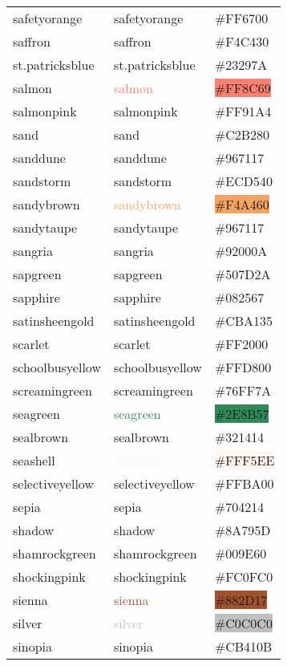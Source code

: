 \documentclass[
]{article}
\begin{document}
\begin{longtable}[]{@{}lll@{}}
safetyorange & \textcolor{safetyorange}{safetyorange} &
\colorbox{safetyorange}{\#FF6700}\tabularnewline
saffron & \textcolor{saffron}{saffron} &
\colorbox{saffron}{\#F4C430}\tabularnewline
st.patricksblue & \textcolor{st.patricksblue}{st.patricksblue} &
\colorbox{st.patricksblue}{\#23297A}\tabularnewline
salmon & \textcolor{salmon}{salmon} &
\colorbox{salmon}{\#FF8C69}\tabularnewline
salmonpink & \textcolor{salmonpink}{salmonpink} &
\colorbox{salmonpink}{\#FF91A4}\tabularnewline
sand & \textcolor{sand}{sand} &
\colorbox{darkchampagne}{\#C2B280}\tabularnewline
sanddune & \textcolor{sanddune}{sanddune} &
\colorbox{drab}{\#967117}\tabularnewline
sandstorm & \textcolor{sandstorm}{sandstorm} &
\colorbox{sandstorm}{\#ECD540}\tabularnewline
sandybrown & \textcolor{sandybrown}{sandybrown} &
\colorbox{sandybrown}{\#F4A460}\tabularnewline
sandytaupe & \textcolor{sandytaupe}{sandytaupe} &
\colorbox{drab}{\#967117}\tabularnewline
sangria & \textcolor{sangria}{sangria} &
\colorbox{sangria}{\#92000A}\tabularnewline
sapgreen & \textcolor{sapgreen}{sapgreen} &
\colorbox{sapgreen}{\#507D2A}\tabularnewline
sapphire & \textcolor{sapphire}{sapphire} &
\colorbox{sapphire}{\#082567}\tabularnewline
satinsheengold & \textcolor{satinsheengold}{satinsheengold} &
\colorbox{satinsheengold}{\#CBA135}\tabularnewline
scarlet & \textcolor{scarlet}{scarlet} &
\colorbox{scarlet}{\#FF2000}\tabularnewline
schoolbusyellow & \textcolor{schoolbusyellow}{schoolbusyellow} &
\colorbox{schoolbusyellow}{\#FFD800}\tabularnewline
screamingreen & \textcolor{screamingreen}{screamingreen} &
\colorbox{screamingreen}{\#76FF7A}\tabularnewline
seagreen & \textcolor{seagreen}{seagreen} &
\colorbox{seagreen}{\#2E8B57}\tabularnewline
sealbrown & \textcolor{sealbrown}{sealbrown} &
\colorbox{sealbrown}{\#321414}\tabularnewline
seashell & \textcolor{seashell}{seashell} &
\colorbox{seashell}{\#FFF5EE}\tabularnewline
selectiveyellow & \textcolor{selectiveyellow}{selectiveyellow} &
\colorbox{selectiveyellow}{\#FFBA00}\tabularnewline
sepia & \textcolor{sepia}{sepia} &
\colorbox{sepia}{\#704214}\tabularnewline
shadow & \textcolor{shadow}{shadow} &
\colorbox{shadow}{\#8A795D}\tabularnewline
shamrockgreen & \textcolor{shamrockgreen}{shamrockgreen} &
\colorbox{shamrockgreen}{\#009E60}\tabularnewline
shockingpink & \textcolor{shockingpink}{shockingpink} &
\colorbox{shockingpink}{\#FC0FC0}\tabularnewline
sienna & \textcolor{sienna}{sienna} &
\colorbox{sienna}{\#882D17}\tabularnewline
silver & \textcolor{silver}{silver} &
\colorbox{silver}{\#C0C0C0}\tabularnewline
sinopia & \textcolor{sinopia}{sinopia} &
\colorbox{sinopia}{\#CB410B}\tabularnewline

\end{longtable}
\end{document}

